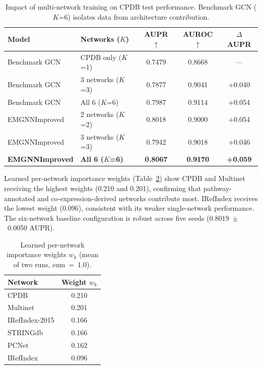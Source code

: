 \begin{table}[ht]
  \centering
  \caption{Impact of multi-network training on CPDB test performance. Benchmark GCN
           ($K$=6) isolates data from architecture contribution.}
  \label{tab:multinetwork}
  \small
  \begin{tabular}{llccc}
    \toprule
    \textbf{Model} & \textbf{Networks ($K$)} & \textbf{AUPR $\uparrow$} & \textbf{AUROC $\uparrow$} & \textbf{$\Delta$ AUPR} \\
    \midrule
    Benchmark GCN    & CPDB only ($K$=1)                   & 0.7479 & 0.8668 & ---    \\
    Benchmark GCN    & 3 networks ($K$=3)                   & 0.7877 & 0.9041 & +0.040 \\
    Benchmark GCN    & All 6 ($K$=6)                        & 0.7987 & 0.9114 & +0.054 \\
    EMGNNImproved    & 2 networks ($K$=2)                   & 0.8018 & 0.9000 & +0.054 \\
    EMGNNImproved    & 3 networks ($K$=3)                   & 0.7942 & 0.9018 & +0.046 \\
    \textbf{EMGNNImproved} & \textbf{All 6 ($K$=6)}  & \textbf{0.8067} & \textbf{0.9170} & \textbf{+0.059} \\
    \bottomrule
  \end{tabular}
\end{table}

Learned per-network importance weights (Table~\ref{tab:netweights}) show CPDB and
Multinet receiving the highest weights (0.210 and 0.201), confirming that
pathway-annotated and co-expression-derived networks contribute most. IRefIndex
receives the lowest weight (0.096), consistent with its weaker single-network
performance. The six-network baseline configuration is robust across five seeds
(0.8019~$\pm$~0.0050 AUPR).

\begin{table}[ht]
  \centering
  \caption{Learned per-network importance weights $w_k$ (mean of two runs, sum~=~1.0).}
  \label{tab:netweights}
  \small
  \begin{tabular}{lc}
    \toprule
    \textbf{Network} & \textbf{Weight $w_k$} \\
    \midrule
    CPDB            & 0.210 \\
    Multinet        & 0.201 \\
    IRefIndex-2015  & 0.166 \\
    STRINGdb        & 0.166 \\
    PCNet           & 0.162 \\
    IRefIndex       & 0.096 \\
    \bottomrule
  \end{tabular}
\end{table}

